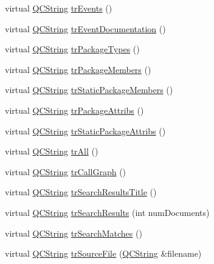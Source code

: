 \begin{DoxyCompactItemize}
\item 
virtual \hyperlink{class_q_c_string}{Q\+C\+String} \hyperlink{class_translator_portuguese_a3d881a57ecc9b039ad91d4f811082e07}{tr\+Events} ()
\item 
virtual \hyperlink{class_q_c_string}{Q\+C\+String} \hyperlink{class_translator_portuguese_a74a3dcbae4a9f56c143ad597c5eb3295}{tr\+Event\+Documentation} ()
\item 
virtual \hyperlink{class_q_c_string}{Q\+C\+String} \hyperlink{class_translator_portuguese_af7256682a5025c429603f8797c6b69a3}{tr\+Package\+Types} ()
\item 
virtual \hyperlink{class_q_c_string}{Q\+C\+String} \hyperlink{class_translator_portuguese_ae9c591a79f87322df06489b69c2eae7f}{tr\+Package\+Members} ()
\item 
virtual \hyperlink{class_q_c_string}{Q\+C\+String} \hyperlink{class_translator_portuguese_a4aebc54ec4c1ab1e8a02d55a801bc770}{tr\+Static\+Package\+Members} ()
\item 
virtual \hyperlink{class_q_c_string}{Q\+C\+String} \hyperlink{class_translator_portuguese_a9844834ead1d1a1aff83c3f6eda97c42}{tr\+Package\+Attribs} ()
\item 
virtual \hyperlink{class_q_c_string}{Q\+C\+String} \hyperlink{class_translator_portuguese_a6e55746ec13ec111016463fa1ea8a294}{tr\+Static\+Package\+Attribs} ()
\item 
virtual \hyperlink{class_q_c_string}{Q\+C\+String} \hyperlink{class_translator_portuguese_aff6802cfce12a2452d0ba2cfa19b2295}{tr\+All} ()
\item 
virtual \hyperlink{class_q_c_string}{Q\+C\+String} \hyperlink{class_translator_portuguese_a30bd52b3143a3cd2fe5baa790d9f8625}{tr\+Call\+Graph} ()
\item 
virtual \hyperlink{class_q_c_string}{Q\+C\+String} \hyperlink{class_translator_portuguese_a6ce6b3b4a0170048b4aa551e6c0b9d7a}{tr\+Search\+Results\+Title} ()
\item 
virtual \hyperlink{class_q_c_string}{Q\+C\+String} \hyperlink{class_translator_portuguese_a41da542c0d9900f3ac2ace6a3f0d5f1d}{tr\+Search\+Results} (int num\+Documents)
\item 
virtual \hyperlink{class_q_c_string}{Q\+C\+String} \hyperlink{class_translator_portuguese_af5e6b6501fc0557ec1443230c5c4909b}{tr\+Search\+Matches} ()
\item 
virtual \hyperlink{class_q_c_string}{Q\+C\+String} \hyperlink{class_translator_portuguese_a1cba7443861e8b21e334611d217d98fe}{tr\+Source\+File} (\hyperlink{class_q_c_string}{Q\+C\+String} \&filename)

\end{DoxyCompactItemize}
